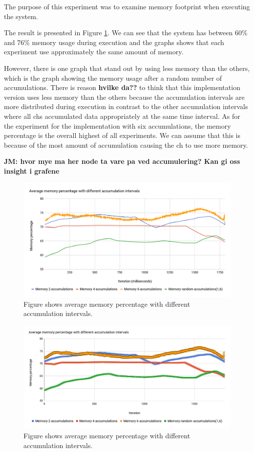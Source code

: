 \documentclass[USenglish]{uit-thesis}
\begin{document}
The purpose of this experiment was to examine memory footprint when executing the system.

The result is presented in Figure \ref{fig:memChart}. We can see that the system has between 60\% and 76\% memory usage during execution and the graphs shows that each experiment use approximately the same amount of memory.

However, there is one graph that stand out by using less memory than the others, which is the graph showing the memory usage after a random number of accumulations.
There is reason \textbf{hvilke da??} to think that this implementation version uses less memory than the others because the accumulation intervals are more distributed during execution in contrast to the other accumulation intervals where all \gls{ch}s accumulated data appropriately at the same time interval. As for the experiment for the implementation with six accumulations, the memory percentage is the overall highest of all experiments. We can assume that this is because of the most amount of accumulation causing the \gls{ch} to use more memory.

\textbf{JM: hvor mye ma her node ta vare pa ved accumulering? Kan gi oss insight i grafene}

\begin{figure} [ht]
\centering
\includegraphics[width=\textwidth]{memChart2.png}
\caption{Figure shows average memory percentage with different accumulation intervals.}
\label{fig:memChart}
\end{figure}


\begin{figure} [ht]
\centering
\includegraphics[width=\textwidth]{memChart_dev.png}
\caption{Figure shows average memory percentage with different accumulation intervals.}
\label{fig:memChartDev}
\end{figure}
\end{document}
